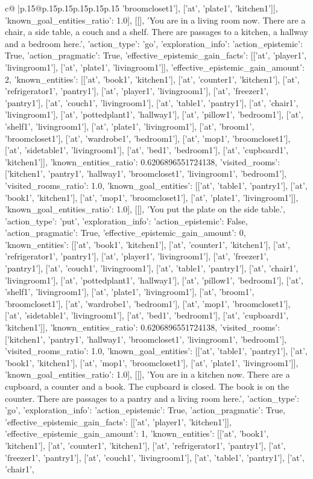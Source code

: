 \documentclass{article}
\begin{document}
{\begin{supertabular}{c@{$\;$}|p{.15\linewidth}@{}p{.15\linewidth}p{.15\linewidth}p{.15\linewidth}p{.15\linewidth}p{.15\linewidth}}
{{{'broomcloset1'], ['at', 'plate1', 'kitchen1']], 'known_goal_entities_ratio': 1.0}}], [[], 'You are in a living room now. There are a chair, a side table, a couch and a shelf. There are passages to a kitchen, a hallway and a bedroom here.', {'action_type': 'go', 'exploration_info': {'action_epistemic': True, 'action_pragmatic': True, 'effective_epistemic_gain_facts': [['at', 'player1', 'livingroom1'], ['at', 'plate1', 'livingroom1']], 'effective_epistemic_gain_amount': 2, 'known_entities': [['at', 'book1', 'kitchen1'], ['at', 'counter1', 'kitchen1'], ['at', 'refrigerator1', 'pantry1'], ['at', 'player1', 'livingroom1'], ['at', 'freezer1', 'pantry1'], ['at', 'couch1', 'livingroom1'], ['at', 'table1', 'pantry1'], ['at', 'chair1', 'livingroom1'], ['at', 'pottedplant1', 'hallway1'], ['at', 'pillow1', 'bedroom1'], ['at', 'shelf1', 'livingroom1'], ['at', 'plate1', 'livingroom1'], ['at', 'broom1', 'broomcloset1'], ['at', 'wardrobe1', 'bedroom1'], ['at', 'mop1', 'broomcloset1'], ['at', 'sidetable1', 'livingroom1'], ['at', 'bed1', 'bedroom1'], ['at', 'cupboard1', 'kitchen1']], 'known_entities_ratio': 0.6206896551724138, 'visited_rooms': ['kitchen1', 'pantry1', 'hallway1', 'broomcloset1', 'livingroom1', 'bedroom1'], 'visited_rooms_ratio': 1.0, 'known_goal_entities': [['at', 'table1', 'pantry1'], ['at', 'book1', 'kitchen1'], ['at', 'mop1', 'broomcloset1'], ['at', 'plate1', 'livingroom1']], 'known_goal_entities_ratio': 1.0}}], [[], 'You put the plate on the side table.', {'action_type': 'put', 'exploration_info': {'action_epistemic': False, 'action_pragmatic': True, 'effective_epistemic_gain_amount': 0, 'known_entities': [['at', 'book1', 'kitchen1'], ['at', 'counter1', 'kitchen1'], ['at', 'refrigerator1', 'pantry1'], ['at', 'player1', 'livingroom1'], ['at', 'freezer1', 'pantry1'], ['at', 'couch1', 'livingroom1'], ['at', 'table1', 'pantry1'], ['at', 'chair1', 'livingroom1'], ['at', 'pottedplant1', 'hallway1'], ['at', 'pillow1', 'bedroom1'], ['at', 'shelf1', 'livingroom1'], ['at', 'plate1', 'livingroom1'], ['at', 'broom1', 'broomcloset1'], ['at', 'wardrobe1', 'bedroom1'], ['at', 'mop1', 'broomcloset1'], ['at', 'sidetable1', 'livingroom1'], ['at', 'bed1', 'bedroom1'], ['at', 'cupboard1', 'kitchen1']], 'known_entities_ratio': 0.6206896551724138, 'visited_rooms': ['kitchen1', 'pantry1', 'hallway1', 'broomcloset1', 'livingroom1', 'bedroom1'], 'visited_rooms_ratio': 1.0, 'known_goal_entities': [['at', 'table1', 'pantry1'], ['at', 'book1', 'kitchen1'], ['at', 'mop1', 'broomcloset1'], ['at', 'plate1', 'livingroom1']], 'known_goal_entities_ratio': 1.0}}], [[], 'You are in a kitchen now. There are a cupboard, a counter and a book. The cupboard is closed. The book is on the counter. There are passages to a pantry and a living room here.', {'action_type': 'go', 'exploration_info': {'action_epistemic': True, 'action_pragmatic': True, 'effective_epistemic_gain_facts': [['at', 'player1', 'kitchen1']], 'effective_epistemic_gain_amount': 1, 'known_entities': [['at', 'book1', 'kitchen1'], ['at', 'counter1', 'kitchen1'], ['at', 'refrigerator1', 'pantry1'], ['at', 'freezer1', 'pantry1'], ['at', 'couch1', 'livingroom1'], ['at', 'table1', 'pantry1'], ['at', 'chair1', }}}
\end{supertabular}}
\end{document}
